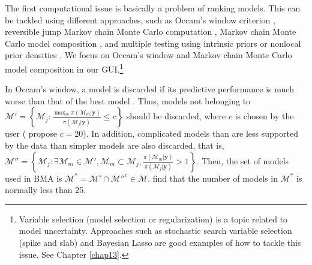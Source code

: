 \begin{table}[!ht]
	\label{tab:chap10}
\end{table}
The first computational issue is basically a problem of ranking models. This can be tackled using different approaches, such as Occam's window criterion \cite{Madigan1994,Raftery1997}, reversible jump Markov chain Monte Carlo computation \cite{Green1995}, Markov chain Monte Carlo model composition \cite{madigan95}, and multiple testing using intrinsic priors \cite{Casella2006} or nonlocal prior densities \cite{Johnson2012}. We focus on Occam's window and Markov chain Monte Carlo model composition in our GUI.\footnote{Variable selection (model selection or regularization) is a topic related to model uncertainty. Approaches such as stochastic search variable selection (spike and slab) \cite{George1993,George1997} and Bayesian Lasso \cite{Park2008} are good examples of how to tackle this issue. See Chapter \ref{chap13}.}

In Occam's window, a model is discarded if its predictive performance is much worse than that of the best model  \cite{Madigan1994,Raftery1997}.
Thus, models not belonging to $\mathcal{M}'=\left\{\mathcal{M}_j:\frac{\max_m {\pi(\mathcal{M}_m|\bm{y})}}{\pi(\mathcal{M}_j|\bm{y})}\leq c\right\}$ should be discarded, where $c$ is chosen by the user (\cite{Madigan1994} propose $c=20$).
In addition, complicated models than are less supported by the data than simpler models are also discarded, that is, $\mathcal{M}''=\left\{\mathcal{M}_j:\exists \mathcal{M}_m\in\mathcal{M}',\mathcal{M}_m\subset \mathcal{M}_j,\frac{\pi(\mathcal{M}_m|\bm{y})}{\pi(\mathcal{M}_j|\bm{y})}>1\right\}$. Then, the set of models used in BMA is $\mathcal{M}^*=\mathcal{M}'\cap \mathcal{M}''^c\in\mathcal{M}$. \cite{Raftery1997} find that the number of models in $\mathcal{M}^*$ is normally less than 25.

